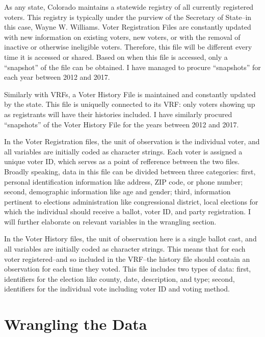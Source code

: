 \documentclass[12pt,twoside]{reedthesis}
\begin{document}
  As any state, Colorado maintains a statewide registry of all currently
  registered voters. This registry is typically under the purview of the
  Secretary of State--in this case, Wayne W. Williams. Voter Registration
  Files are constantly updated with new information on existing voters,
  new voters, or with the removal of inactive or otherwise ineligible
  voters. Therefore, this file will be different every time it is accessed
  or shared. Based on when this file is accessed, only a ``snapshot'' of
  the file can be obtained. I have managed to procure ``snapshots'' for
  each year between 2012 and 2017.
  
  Similarly with VRFs, a Voter History File is maintained and constantly
  updated by the state. This file is uniquelly connected to its VRF: only
  voters showing up as registrants will have their histories included. I
  have similarly procured ``snapshots'' of the Voter History File for the
  years between 2012 and 2017.
  
  In the Voter Registration files, the unit of observation is the
  individual voter, and all variables are initially coded as character
  strings. Each voter is assigned a unique voter ID, which serves as a
  point of refference between the two files. Broadly speaking, data in
  this file can be divided between three categories: first, personal
  identification information like address, ZIP code, or phone number;
  second, demographic information like age and gender; third, information
  pertinent to elections administration like congressional district, local
  elections for which the individual should receive a ballot, voter ID,
  and party registration. I will further elaborate on relevant variables
  in the wrangling section.
  
  In the Voter History files, the unit of observation here is a single
  ballot cast, and all variables are initially coded as character strings.
  This means that for each voter registered--and so included in the
  VRF--the history file should contain an observation for each time they
  voted. This file includes two types of data: first, identifiers for the
  election like county, date, description, and type; second, identifiers
  for the individual vote including voter ID and voting method.
  
  \section{Wrangling the Data}\label{wrangling-the-data}
  
\end{document}
